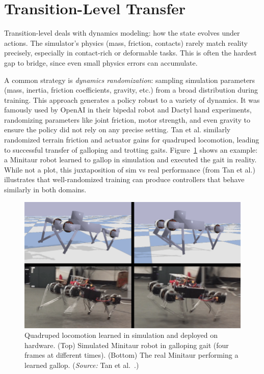 \section{Transition-Level Transfer}
Transition-level \simtoreal deals with dynamics modeling: how the state evolves under actions. The simulator’s physics (mass, friction, contacts) rarely match reality precisely, especially in contact-rich or deformable tasks. This is often the hardest gap to bridge, since even small physics errors can accumulate.

A common strategy is \emph{dynamics randomization}: sampling simulation parameters (mass, inertia, friction coefficients, gravity, etc.) from a broad distribution during training. This approach generates a policy robust to a variety of dynamics. It was famously used by OpenAI in their bipedal robot and Dactyl hand experiments, randomizing parameters like joint friction, motor strength, and even gravity to ensure the policy did not rely on any precise setting\cite{Akkaya2019}. Tan et al. similarly randomized terrain friction and actuator gains for quadruped locomotion, leading to successful transfer of galloping and trotting gaits\cite{Tan2018}. Figure~\ref{fig:quadruped} shows an example: a Minitaur robot learned to gallop in simulation and executed the gait in reality. While not a plot, this juxtaposition of sim vs real performance (from Tan et al.) illustrates that well-randomized training can produce controllers that behave similarly in both domains.

\begin{figure}[H]
    \centering
    \includegraphics[width=0.95\linewidth]{figures/figMinitaurGallop.png}
    \caption{Quadruped locomotion learned in simulation and deployed on hardware.  (Top) Simulated Minitaur robot in galloping gait (four frames at different times). (Bottom) The real Minitaur performing a learned gallop. (\emph{Source:} Tan et al.~\cite{Tan2018}.)}
    \label{fig:quadruped}
\end{figure}

